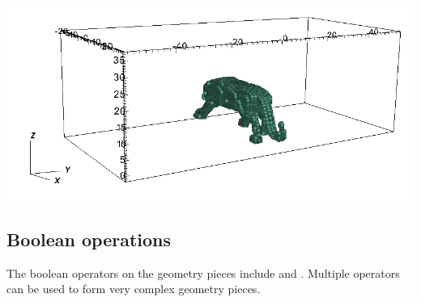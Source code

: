 \begin{minipage}{0.35\textwidth}
  \includegraphics[width=\columnwidth]{FIGS/geometry/geom_tri_stl_sequence.png}
\end{minipage}

\subsection{Boolean operations}
The boolean operators on the geometry pieces include  and .
Multiple operators can be used to form very complex geometry pieces.

